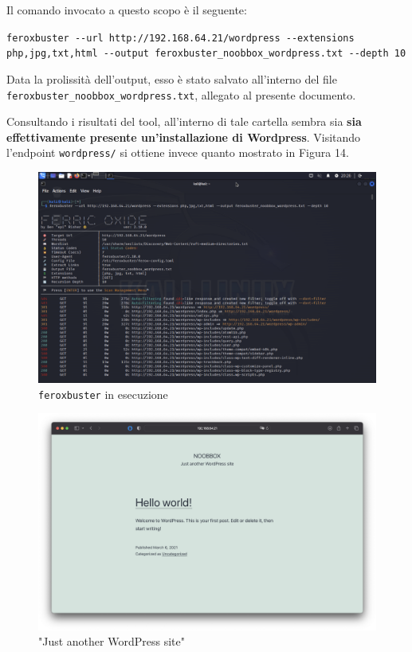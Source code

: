 \documentclass[a4paper, 12pt, oneside]{article}
\begin{document}
Il comando invocato a questo scopo è il seguente:

\begin{center}
    \texttt{feroxbuster -{}-url http://192.168.64.21/wordpress -{}-extensions php,jpg,txt,html -{}-output feroxbuster\_noobbox\_wordpress.txt  -{}-depth 10}
\end{center}

Data la prolissità dell'output, esso è stato salvato all'interno del file \texttt{feroxbuster\_noobbox\_wordpress.txt}, allegato al presente documento.

Consultando i risultati del tool, all'interno di tale cartella sembra sia \textbf{sia effettivamente presente un'installazione di Wordpress}. Visitando l'endpoint \texttt{wordpress/} si ottiene invece quanto mostrato in Figura 14.

\begin{figure}[h!]
    \centering
    \includegraphics[width=\textwidth]{img/feroxbuster.png}
    \caption{\texttt{feroxbuster} in esecuzione}
\end{figure}

\begin{figure}[h!]
    \centering
    \includegraphics[width=\textwidth]{img/wordpress.png}
    \caption{"Just another WordPress site"}
\end{figure}
\end{document}
